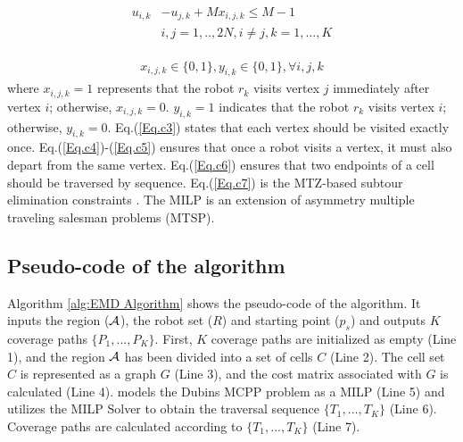 \documentclass[journal,article,submit,pdftex,moreauthors]{Definitions/mdpi}
\begin{document}
\begin{equation}\label{Eq.c7}
\begin{aligned}
\begin{split}
   u_{i,k} &- u_{j,k} + Mx_{i,j,k} \leq M-1 \\
     &i,j =1,..,2N, i \neq j, k=1,...,K
\end{split}
\end{aligned}
\end{equation}

\begin{equation}\label{Eq.c8}
\begin{aligned}
x_{i,j,k} \in \{0,1\}, y_{i,k} \in \{0,1\}, \forall i,j,k
\end{aligned}
\end{equation}
where $x_{i,j,k} = 1$ represents that the robot $r_k$ visits vertex $j$ immediately after vertex $i$; otherwise, $x_{i,j,k} = 0$. $y_{i,k} = 1$ indicates that the robot $r_k$ visits vertex $i$; otherwise, $y_{i,k} = 0$. Eq.(\ref{Eq.c3}) states that each vertex should be visited exactly once. Eq.(\ref{Eq.c4})-(\ref{Eq.c5}) ensures that once a robot visits a vertex, it must also depart from the same vertex. Eq.(\ref{Eq.c6}) ensures that two endpoints of a cell should be traversed by sequence. Eq.(\ref{Eq.c7}) is the MTZ-based subtour elimination constraints \cite{miller1960integer}. The MILP is an extension of asymmetry multiple traveling salesman problems (MTSP).


\subsection{Pseudo-code of the  algorithm}
Algorithm \ref{alg:EMD Algorithm} shows the pseudo-code of the  algorithm. It inputs the region ($\cal{A}$), the robot set ($R$) and starting point ($p_s$) and outputs $K$ coverage paths $\{P_1, ...,P_K\}$. First, $K$ coverage paths are initialized as empty (Line 1), and the region $\cal{A}$ has been divided into a set of cells $C$ (Line 2). The cell set $C$ is represented as a graph $G$ (Line 3), and the cost matrix associated with $G$ is calculated (Line 4).  models the Dubins MCPP problem as a MILP (Line 5) and utilizes the MILP Solver \cite{bixby2007gurobi}  to obtain the traversal sequence $\{T_1, ..., T_K\}$ (Line 6). Coverage paths are calculated according to $\{T_1, ...,T_K\}$ (Line 7).
\end{document}
